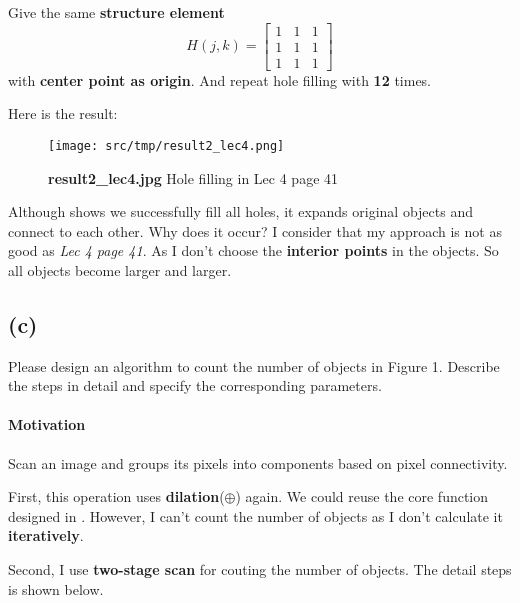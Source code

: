 Give the same \textbf{structure element}
\[
    H(j, k) = \begin{bmatrix}
	1 & 1 & 1\\
	1 & 1 & 1\\
	1 & 1 & 1
    \end{bmatrix}
\]
with \textbf{center point as origin}. And repeat hole filling with \textbf{12} times.

Here is the result: 
\begin{figure}
    \centering
    \texttt{[image: src/tmp/result2\_lec4.png]}
    \caption{\textbf{result2\_lec4.jpg} Hole filling in Lec 4 page 41}
    \label{result2_lec4}
\end{figure}

Although  shows we successfully fill all holes, it expands original objects and connect to each other. 
Why does it occur? I consider that my approach is not as good as \textit{Lec 4 page 41}. As I don't choose the \textbf{interior points} in the objects. So all objects become larger and larger.

\subsection{(c)}\label{1_c}
Please design an algorithm to count the number of objects in Figure 1. Describe the steps in detail and specify the corresponding parameters.

\paragraph{Motivation}
Scan an image and groups its pixels into components based on pixel connectivity.

First, this operation uses \textbf{dilation}(\(\oplus \)) again. We could reuse the core function designed in . However, I can't count the number of objects as I don't calculate it \textbf{iteratively}.

Second, I use \textbf{two-stage scan} for couting the number of objects. The detail steps is shown below.

